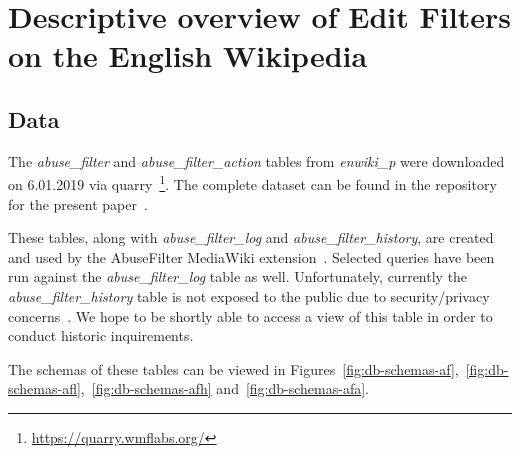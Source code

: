 \chapter{Descriptive overview of Edit Filters on the English Wikipedia}
\label{chap:overview-en-wiki}

\section{Data}

\begin{comment}
vgl \cite{GeiHal2017}
iterative mixed method
combination of:
* quantitative methods: mining big data sets/computational social science
"begin with one or
more large (but often thin) datasets generated by a software platform, which has recorded digital
traces that users leave in interacting on that platform. Such researchers then seek to mine as much
signal and significance from these found datasets as they can at scale in order to answer a research
question"
* more traditional social science/qualitative methods, e.g. interviews, observations, experiments
\end{comment}

The \emph{abuse\_filter} and \emph{abuse\_filter\_action} tables from \emph{enwiki\_p} were downloaded on 6.01.2019 via quarry~\footnote{\url{https://quarry.wmflabs.org/}}.
The complete dataset can be found in the repository for the present paper~\cite{github}. %

These tables, along with \emph{abuse\_filter\_log} and \emph{abuse\_filter\_history}, are created and used by the AbuseFilter MediaWiki extension~\cite{gerrit-abusefilter}.
Selected queries have been run against the \emph{abuse\_filter\_log} table as well.
Unfortunately, currently the \emph{abuse\_filter\_history} table is not exposed to the public due to security/privacy concerns~\cite{phabricator}.
We hope to be shortly able to access a view of this table in order to conduct historic inquirements.

The schemas of these tables can be viewed in Figures~\ref{fig:db-schemas-af},~\ref{fig:db-schemas-afl},~\ref{fig:db-schemas-afh} and~\ref{fig:db-schemas-afa}.

